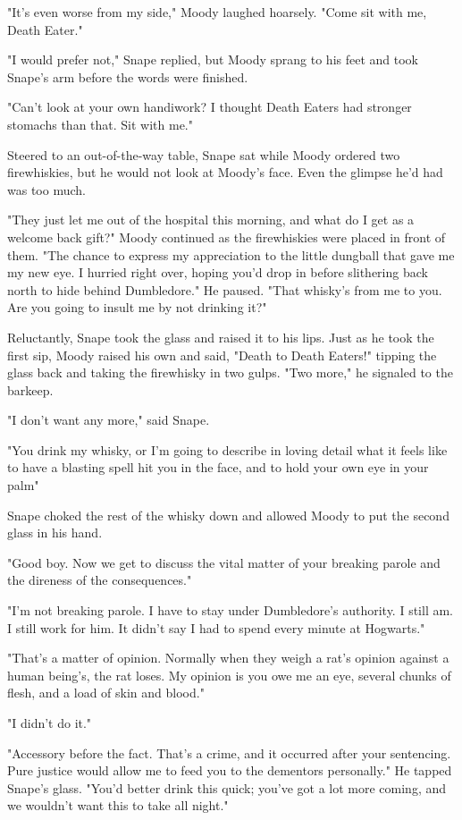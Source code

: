"It's even worse from my side," Moody laughed hoarsely. "Come sit with me, Death Eater."

"I would prefer not," Snape replied, but Moody sprang to his feet and took Snape's arm before the words were finished.

"Can't look at your own handiwork? I thought Death Eaters had stronger stomachs than that. Sit with me."

Steered to an out-of-the-way table, Snape sat while Moody ordered two firewhiskies, but he would not look at Moody's face. Even the glimpse he'd had was too much.

"They just let me out of the hospital this morning, and what do I get as a welcome back gift?" Moody continued as the firewhiskies were placed in front of them. "The chance to express my appreciation to the little dungball that gave me my new eye. I hurried right over, hoping you'd drop in before slithering back north to hide behind Dumbledore." He paused. "That whisky's from me to you. Are you going to insult me by not drinking it?"

Reluctantly, Snape took the glass and raised it to his lips. Just as he took the first sip, Moody raised his own and said, "Death to Death Eaters!" tipping the glass back and taking the firewhisky in two gulps. "Two more," he signaled to the barkeep.

"I don't want any more," said Snape.

"You drink my whisky, or I'm going to describe in loving detail what it feels like to have a blasting spell hit you in the face, and to hold your own eye in your palm{\el}"

Snape choked the rest of the whisky down and allowed Moody to put the second glass in his hand.

"Good boy. Now we get to discuss the vital matter of your breaking parole and the direness of the consequences."

"I'm not breaking parole. I have to stay under Dumbledore's authority. I still am. I still work for him. It didn't say I had to spend every minute at Hogwarts."

"That's a matter of opinion. Normally when they weigh a rat's opinion against a human being's, the rat loses. My opinion is you owe me an eye, several chunks of flesh, and a load of skin and blood."

"I didn't do it."

"Accessory before the fact. That's a crime, and it occurred after your sentencing. Pure justice would allow me to feed you to the dementors personally." He tapped Snape's glass. "You'd better drink this quick; you've got a lot more coming, and we wouldn't want this to take all night."

